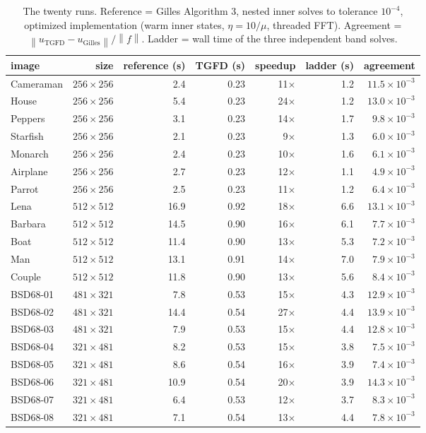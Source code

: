 \documentclass[11pt]{article}
\newcommand{\norm}[1]{\left\lVert #1 \right\rVert}
\begin{document}
\begin{table}[h]
\centering
\caption{The twenty runs. Reference = Gilles Algorithm 3, nested inner
solves to tolerance $10^{-4}$, optimized implementation (warm inner
states, $\eta=10/\mu$, threaded FFT). Agreement =
$\norm{u_{\mathrm{TGFD}}-u_{\mathrm{Gilles}}}/\norm{f}$. Ladder = wall
time of the three independent band solves.}
\label{tab:runs}
\begin{tabular}{lrrrrrr}
\toprule
image & size & reference (s) & TGFD (s) & speedup & ladder (s) & agreement\\
\midrule
Cameraman & $256\times256$ & 2.4 & 0.23 & 11$\times$ & 1.2 & $11.5\times10^{-3}$ \\
House & $256\times256$ & 5.4 & 0.23 & 24$\times$ & 1.2 & $13.0\times10^{-3}$ \\
Peppers & $256\times256$ & 3.1 & 0.23 & 14$\times$ & 1.7 & $9.8\times10^{-3}$ \\
Starfish & $256\times256$ & 2.1 & 0.23 & 9$\times$ & 1.3 & $6.0\times10^{-3}$ \\
Monarch & $256\times256$ & 2.4 & 0.23 & 10$\times$ & 1.6 & $6.1\times10^{-3}$ \\
Airplane & $256\times256$ & 2.7 & 0.23 & 12$\times$ & 1.1 & $4.9\times10^{-3}$ \\
Parrot & $256\times256$ & 2.5 & 0.23 & 11$\times$ & 1.2 & $6.4\times10^{-3}$ \\
Lena & $512\times512$ & 16.9 & 0.92 & 18$\times$ & 6.6 & $13.1\times10^{-3}$ \\
Barbara & $512\times512$ & 14.5 & 0.90 & 16$\times$ & 6.1 & $7.7\times10^{-3}$ \\
Boat & $512\times512$ & 11.4 & 0.90 & 13$\times$ & 5.3 & $7.2\times10^{-3}$ \\
Man & $512\times512$ & 13.1 & 0.91 & 14$\times$ & 7.0 & $7.9\times10^{-3}$ \\
Couple & $512\times512$ & 11.8 & 0.90 & 13$\times$ & 5.6 & $8.4\times10^{-3}$ \\
BSD68-01 & $481\times321$ & 7.8 & 0.53 & 15$\times$ & 4.3 & $12.9\times10^{-3}$ \\
BSD68-02 & $481\times321$ & 14.4 & 0.54 & 27$\times$ & 4.4 & $13.9\times10^{-3}$ \\
BSD68-03 & $481\times321$ & 7.9 & 0.53 & 15$\times$ & 4.4 & $12.8\times10^{-3}$ \\
BSD68-04 & $321\times481$ & 8.2 & 0.53 & 15$\times$ & 3.8 & $7.5\times10^{-3}$ \\
BSD68-05 & $321\times481$ & 8.6 & 0.54 & 16$\times$ & 3.9 & $7.4\times10^{-3}$ \\
BSD68-06 & $321\times481$ & 10.9 & 0.54 & 20$\times$ & 3.9 & $14.3\times10^{-3}$ \\
BSD68-07 & $321\times481$ & 6.4 & 0.53 & 12$\times$ & 3.7 & $8.3\times10^{-3}$ \\
BSD68-08 & $321\times481$ & 7.1 & 0.54 & 13$\times$ & 4.4 & $7.8\times10^{-3}$ \\
\bottomrule
\end{tabular}
\end{table}
\end{document}
